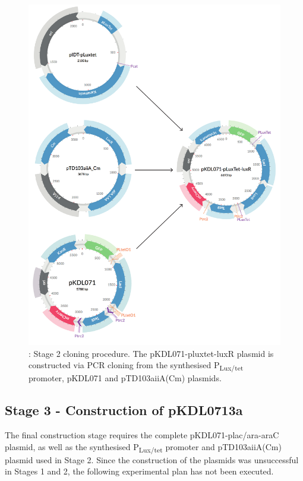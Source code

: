 \begin{figure}[htbp]
	\begin{center}
		\includegraphics[scale=0.6]{../../chapters/chapterDesignSwitches/images/stage2_cloning.pdf}
		\caption[LoF caption]{\label{fig:stage2}: Stage 2 cloning procedure. The pKDL071-pluxtet-luxR  plasmid is constructed via PCR cloning from the synthesised P\textsubscript{Lux/tet} promoter, pKDL071 and pTD103aiiA(Cm) plasmids.}
	\end{center}
\end{figure}
\clearpage



\subsection{Stage 3 - Construction of pKDL0713a}

The final construction stage requires the complete pKDL071-plac/ara-araC plasmid, as well as the synthesised P\textsubscript{Lux/tet} promoter and pTD103aiiA(Cm) plasmid used in Stage 2. Since the construction of the plasmids was unsuccessful in Stages 1 and 2, the following experimental plan has not been executed.


